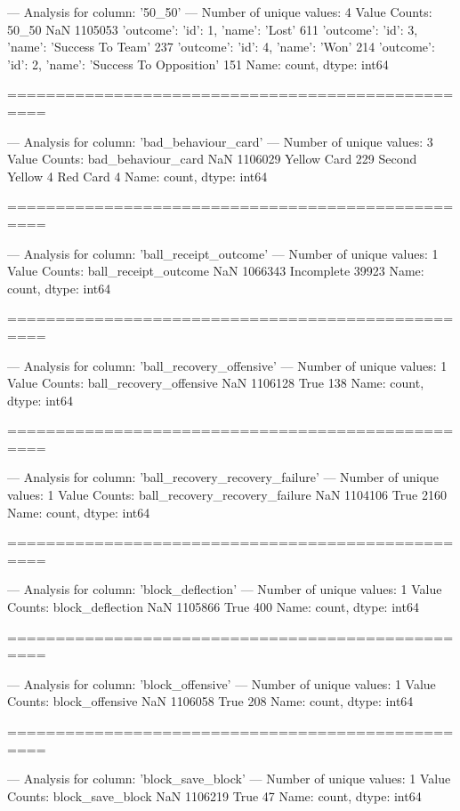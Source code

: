 --- Analysis for column: '50_50' ---
Number of unique values: 4
Value Counts:
50_50
NaN                                                        1105053
{'outcome': {'id': 1, 'name': 'Lost'}}                         611
{'outcome': {'id': 3, 'name': 'Success To Team'}}              237
{'outcome': {'id': 4, 'name': 'Won'}}                          214
{'outcome': {'id': 2, 'name': 'Success To Opposition'}}        151
Name: count, dtype: int64

==================================================

--- Analysis for column: 'bad_behaviour_card' ---
Number of unique values: 3
Value Counts:
bad_behaviour_card
NaN              1106029
Yellow Card          229
Second Yellow          4
Red Card               4
Name: count, dtype: int64

==================================================

--- Analysis for column: 'ball_receipt_outcome' ---
Number of unique values: 1
Value Counts:
ball_receipt_outcome
NaN           1066343
Incomplete      39923
Name: count, dtype: int64

==================================================

--- Analysis for column: 'ball_recovery_offensive' ---
Number of unique values: 1
Value Counts:
ball_recovery_offensive
NaN     1106128
True        138
Name: count, dtype: int64

==================================================

--- Analysis for column: 'ball_recovery_recovery_failure' ---
Number of unique values: 1
Value Counts:
ball_recovery_recovery_failure
NaN     1104106
True       2160
Name: count, dtype: int64

==================================================

--- Analysis for column: 'block_deflection' ---
Number of unique values: 1
Value Counts:
block_deflection
NaN     1105866
True        400
Name: count, dtype: int64

==================================================

--- Analysis for column: 'block_offensive' ---
Number of unique values: 1
Value Counts:
block_offensive
NaN     1106058
True        208
Name: count, dtype: int64

==================================================

--- Analysis for column: 'block_save_block' ---
Number of unique values: 1
Value Counts:
block_save_block
NaN     1106219
True         47
Name: count, dtype: int64

